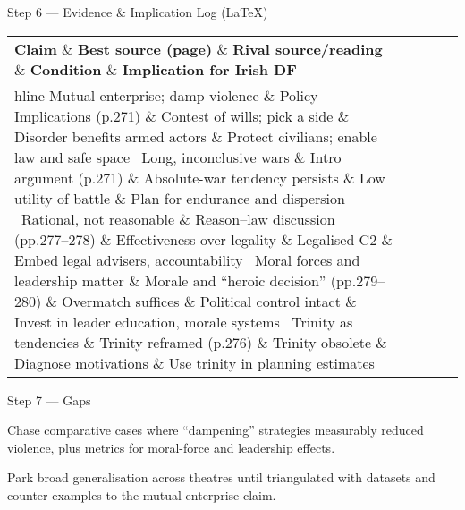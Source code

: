Step 6 — Evidence \& Implication Log (LaTeX)

\begin{tabular}{p{3.2cm}p{4.2cm}p{3.6cm}p{3.2cm}p{4.2cm}}
	\textbf{Claim} \& \textbf{Best source (page)} \& \textbf{Rival source/reading} \& \textbf{Condition} \& \textbf{Implication for Irish DF}\\hline
	Mutual enterprise; damp violence \& Policy Implications (p.271) \& Contest of wills; pick a side \& Disorder benefits armed actors \& Protect civilians; enable law and safe space \
	Long, inconclusive wars \& Intro argument (p.271) \& Absolute-war tendency persists \& Low utility of battle \& Plan for endurance and dispersion \
	Rational, not reasonable \& Reason–law discussion (pp.277–278) \& Effectiveness over legality \& Legalised C2 \& Embed legal advisers, accountability \
	Moral forces and leadership matter \& Morale and “heroic decision” (pp.279–280) \& Overmatch suffices \& Political control intact \& Invest in leader education, morale systems \
	Trinity as tendencies \& Trinity reframed (p.276) \& Trinity obsolete \& Diagnose motivations \& Use trinity in planning estimates \
\end{tabular}

Step 7 — Gaps

Chase comparative cases where “dampening” strategies measurably reduced violence, plus metrics for moral-force and leadership effects.

Park broad generalisation across theatres until triangulated with datasets and counter-examples to the mutual-enterprise claim.

\parencite{KALDOR_2004}

